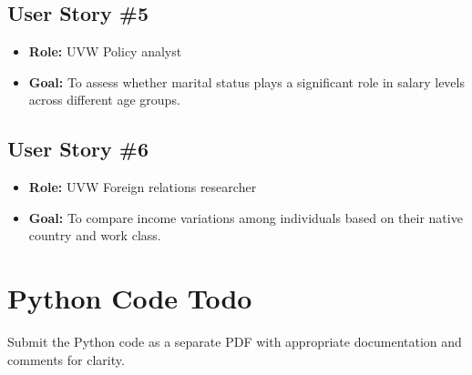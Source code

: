 \documentclass[journal]{IEEEtran}
\begin{document}
\subsection{User Story \#5}
\begin{itemize}
    \item \textbf{Role:} UVW Policy analyst
    \item \textbf{Goal:} To assess whether marital status plays a significant role in salary levels across different age groups.
\end{itemize}

\subsection{User Story \#6}
\begin{itemize}
    \item \textbf{Role:} UVW Foreign relations researcher
    \item \textbf{Goal:} To compare income variations among individuals based on their native country and work class.
\end{itemize}


\section{Python Code Todo}
Submit the Python code as a separate PDF with appropriate documentation and comments for clarity.
\end{document}
